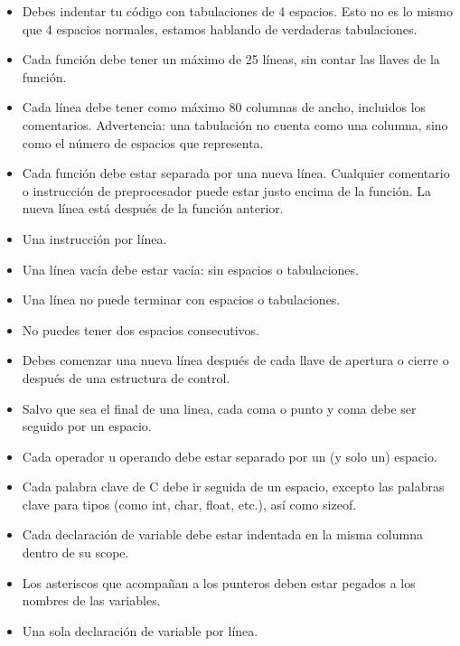 \documentclass{42-es}
\begin{document}
\begin{itemize}

      \item Debes indentar tu código con tabulaciones de 4 espacios.
            Esto no es lo mismo que 4 espacios normales, estamos hablando de
            verdaderas tabulaciones.
      \item Cada función debe tener un máximo de 25 líneas, sin contar las
            llaves
            de la función.
      \item Cada línea debe tener como máximo 80 columnas de ancho, incluidos
            los
            comentarios. Advertencia: una tabulación no cuenta como una
            columna,
            sino como
            el número de espacios que representa.
      \item Cada función debe estar separada por una nueva línea. Cualquier
            comentario
            o instrucción de preprocesador puede estar justo encima de la
            función. La
            nueva línea está después de la función anterior.
      \item Una instrucción por línea.
      \item Una línea vacía debe estar vacía: sin espacios o tabulaciones.
      \item Una línea no puede terminar con espacios o tabulaciones.
      \item No puedes tener dos espacios consecutivos.
      \item Debes comenzar una nueva línea después de cada llave de apertura o
            cierre o después de una estructura de control.
      \item Salvo que sea el final de una linea, cada coma o punto y coma
            debe ser seguido por un espacio.
      \item Cada operador u operando debe estar separado por un (y solo un)
            espacio.
      \item Cada palabra clave de C debe ir seguida de un espacio, excepto las
            palabras clave para tipos (como int, char, float, etc.), así como
            sizeof.
      \item Cada declaración de variable debe estar indentada en la misma
            columna
            dentro de su scope.
      \item Los asteriscos que acompañan a los punteros deben estar pegados a
            los
            nombres de las variables.
      \item Una sola declaración de variable por línea.

\end{itemize}
\end{document}
